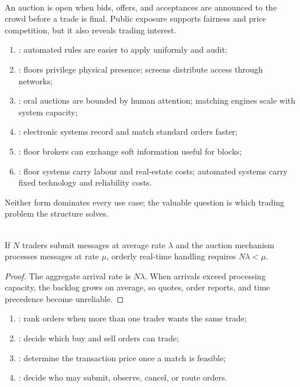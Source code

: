 \documentclass[a4paper,oneside,openany]{book}
\begin{document}
\begin{marketrule} \\
An auction is open when bids, offers, and acceptances are announced to the crowd before a trade is final. Public exposure supports fairness and price competition, but it also reveals trading interest.
\end{marketrule}

\begin{taxonomy} 
\begin{enumerate}[label=\roman*.]
\setlength{\itemsep}{0pt}
\item {}: automated rules are easier to apply uniformly and audit;
\item {}: floors privilege physical presence; screens distribute access through networks;
\item {}: oral auctions are bounded by human attention; matching engines scale with system capacity;
\item {}: electronic systems record and match standard orders faster;
\item {}: floor brokers can exchange soft information useful for blocks;
\item {}: floor systems carry labour and real-estate costs; automated systems carry fixed technology and reliability costs.
\end{enumerate}
Neither form dominates every use case; the valuable question is which trading problem the structure solves.
\end{taxonomy}

\begin{proposition} \\
If $N$ traders submit messages at average rate $\lambda$ and the auction mechanism processes messages at rate $\mu$, orderly real-time handling requires $N\lambda<\mu$.
\begin{proof}
The aggregate arrival rate is $N\lambda$. When arrivals exceed processing capacity, the backlog grows on average, so quotes, order reports, and time precedence become unreliable.
\end{proof}
\end{proposition}

\begin{taxonomy} 
\begin{enumerate}[label=\roman*.]
\setlength{\itemsep}{0pt}
\item {}: rank orders when more than one trader wants the same trade;
\item {}: decide which buy and sell orders can trade;
\item {}: determine the transaction price once a match is feasible;
\item {}: decide who may submit, observe, cancel, or route orders.
\end{enumerate}
\end{taxonomy}
\end{document}
